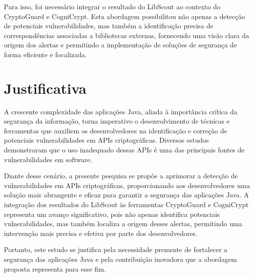 Para isso, foi necessário integrar o resultado do LibScout ao contexto do CryptoGuard e CogniCrypt. Esta abordagem possibilitou não apenas a detecção de potenciais vulnerabilidades, mas também a identificação precisa de correspondências associadas a bibliotecas externas, fornecendo uma visão clara da origem dos alertas e permitindo a implementação de soluções de segurança de forma eficiente e focalizada.

\section{Justificativa}

A crescente complexidade das aplicações Java, aliada à importância crítica da segurança da informação, torna imperativo o desenvolvimento de técnicas e ferramentas que auxiliem os desenvolvedores na identificação e correção de potenciais vulnerabilidades em APIs criptográficas. Diversos estudos demonstraram que o uso inadequado dessas APIs é uma das principais fontes de vulnerabilidades em software. 

Diante desse cenário, a presente pesquisa se propõe a aprimorar a detecção de vulnerabilidades em APIs criptográficas, proporcionando aos desenvolvedores uma solução mais abrangente e eficaz para garantir a segurança das aplicações Java. A integração dos resultados do LibScout às ferramentas CryptoGuard e CogniCrypt representa um avanço significativo, pois não apenas identifica potenciais vulnerabilidades, mas também localiza a origem desses alertas, permitindo uma intervenção mais precisa e efetiva por parte dos desenvolvedores. 

Portanto, este estudo se justifica pela necessidade premente de fortalecer a segurança das aplicações Java e pela contribuição inovadora que a abordagem proposta representa para esse fim.
